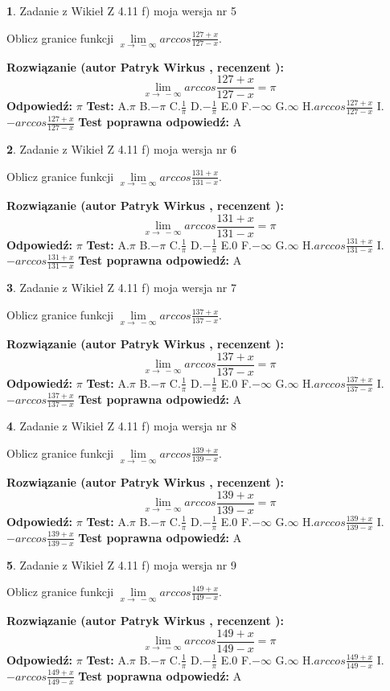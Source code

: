 \documentclass[12pt, a4paper]{article}
\theoremstyle{definition} %
\newtheorem{zad}{}
\newcommand{\zadStart}[1]{\begin{zad}#1\newline}
\newcommand{\zadStop}{\end{zad}}
\newcommand{\rozwStart}[2]{\noindent \textbf{Rozwiązanie (autor #1 , recenzent #2): }\newline}
\newcommand{\rozwStop}{\newline}
\newcommand{\odpStart}{\noindent \textbf{Odpowiedź:}\newline}
\newcommand{\odpStop}{\newline}
\newcommand{\testStart}{\noindent \textbf{Test:}\newline}
\newcommand{\testStop}{\newline}
\newcommand{\kluczStart}{\noindent \textbf{Test poprawna odpowiedź:}\newline}
\newcommand{\kluczStop}{\newline}
\begin{document}
\zadStart{Zadanie z Wikieł Z 4.11 f) moja wersja nr 5}

Oblicz granice funkcji $\lim\limits_{x\to\ -\infty}arccos\frac{127+x}{127-x}$.
\zadStop
\rozwStart{Patryk Wirkus}{}
$$\lim\limits_{x\to\ -\infty}arccos\frac{127+x}{127-x} = \pi$$
\rozwStop
\odpStart
$\pi$
\odpStop
\testStart
A.$\pi$ B.$-\pi$ C.$\frac{1}{\pi}$ D.$-\frac{1}{\pi}$ E.$0$ F.$-\infty$ G.$\infty$ H.$arccos\frac{127+x}{127-x}$ I.$-arccos\frac{127+x}{127-x}$
\testStop
\kluczStart
A
\kluczStop



\zadStart{Zadanie z Wikieł Z 4.11 f) moja wersja nr 6}

Oblicz granice funkcji $\lim\limits_{x\to\ -\infty}arccos\frac{131+x}{131-x}$.
\zadStop
\rozwStart{Patryk Wirkus}{}
$$\lim\limits_{x\to\ -\infty}arccos\frac{131+x}{131-x} = \pi$$
\rozwStop
\odpStart
$\pi$
\odpStop
\testStart
A.$\pi$ B.$-\pi$ C.$\frac{1}{\pi}$ D.$-\frac{1}{\pi}$ E.$0$ F.$-\infty$ G.$\infty$ H.$arccos\frac{131+x}{131-x}$ I.$-arccos\frac{131+x}{131-x}$
\testStop
\kluczStart
A
\kluczStop



\zadStart{Zadanie z Wikieł Z 4.11 f) moja wersja nr 7}

Oblicz granice funkcji $\lim\limits_{x\to\ -\infty}arccos\frac{137+x}{137-x}$.
\zadStop
\rozwStart{Patryk Wirkus}{}
$$\lim\limits_{x\to\ -\infty}arccos\frac{137+x}{137-x} = \pi$$
\rozwStop
\odpStart
$\pi$
\odpStop
\testStart
A.$\pi$ B.$-\pi$ C.$\frac{1}{\pi}$ D.$-\frac{1}{\pi}$ E.$0$ F.$-\infty$ G.$\infty$ H.$arccos\frac{137+x}{137-x}$ I.$-arccos\frac{137+x}{137-x}$
\testStop
\kluczStart
A
\kluczStop



\zadStart{Zadanie z Wikieł Z 4.11 f) moja wersja nr 8}

Oblicz granice funkcji $\lim\limits_{x\to\ -\infty}arccos\frac{139+x}{139-x}$.
\zadStop
\rozwStart{Patryk Wirkus}{}
$$\lim\limits_{x\to\ -\infty}arccos\frac{139+x}{139-x} = \pi$$
\rozwStop
\odpStart
$\pi$
\odpStop
\testStart
A.$\pi$ B.$-\pi$ C.$\frac{1}{\pi}$ D.$-\frac{1}{\pi}$ E.$0$ F.$-\infty$ G.$\infty$ H.$arccos\frac{139+x}{139-x}$ I.$-arccos\frac{139+x}{139-x}$
\testStop
\kluczStart
A
\kluczStop



\zadStart{Zadanie z Wikieł Z 4.11 f) moja wersja nr 9}

Oblicz granice funkcji $\lim\limits_{x\to\ -\infty}arccos\frac{149+x}{149-x}$.
\zadStop
\rozwStart{Patryk Wirkus}{}
$$\lim\limits_{x\to\ -\infty}arccos\frac{149+x}{149-x} = \pi$$
\rozwStop
\odpStart
$\pi$
\odpStop
\testStart
A.$\pi$ B.$-\pi$ C.$\frac{1}{\pi}$ D.$-\frac{1}{\pi}$ E.$0$ F.$-\infty$ G.$\infty$ H.$arccos\frac{149+x}{149-x}$ I.$-arccos\frac{149+x}{149-x}$
\testStop
\kluczStart
A
\kluczStop
\end{document}
